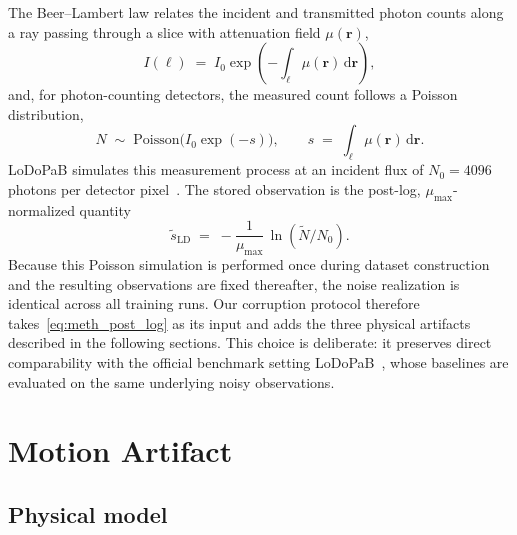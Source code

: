 The Beer--Lambert law relates the incident and transmitted photon counts along a ray passing through a slice with attenuation field $\mu(\mathbf{r})$,
\begin{equation}
    I(\ell) \;=\; I_0 \exp\!\left(-\int_{\ell}\mu(\mathbf{r})\,\mathrm{d}\mathbf{r}\right),
    \label{eq:meth_beer_lambert}
\end{equation}
and, for photon-counting detectors, the measured count follows a Poisson distribution,
\begin{equation}
    N \;\sim\; \mathrm{Poisson}\!\big(I_0 \exp(-s)\big), \qquad
    s \;=\; \int_{\ell}\mu(\mathbf{r})\,\mathrm{d}\mathbf{r}.
    \label{eq:meth_poisson}
\end{equation}
\mbox{LoDoPaB} simulates this measurement process at an incident flux of $N_0 = 4096$ photons per detector pixel~\cite{Leuschner2021}. The stored observation is the post-log, $\mu_{\max}$-normalized quantity
\begin{equation}
    \tilde{s}_{\mathrm{LD}} \;=\; -\frac{1}{\mu_{\max}}\,\ln\!\left(\tilde{N}/N_0\right).
    \label{eq:meth_post_log}
\end{equation}
Because this Poisson simulation is performed once during dataset construction and the resulting observations are fixed thereafter, the noise realization is identical across all training runs. Our corruption protocol therefore takes~\eqref{eq:meth_post_log} as its input and adds the three physical artifacts described in the following sections. This choice is deliberate: it preserves direct comparability with the official benchmark setting \mbox{LoDoPaB}~\cite{Leuschner2021, Kiss2024}, whose baselines are evaluated on the same underlying noisy observations.

\section{Motion Artifact}
\label{sec:meth_motion}

\subsection{Physical model}

